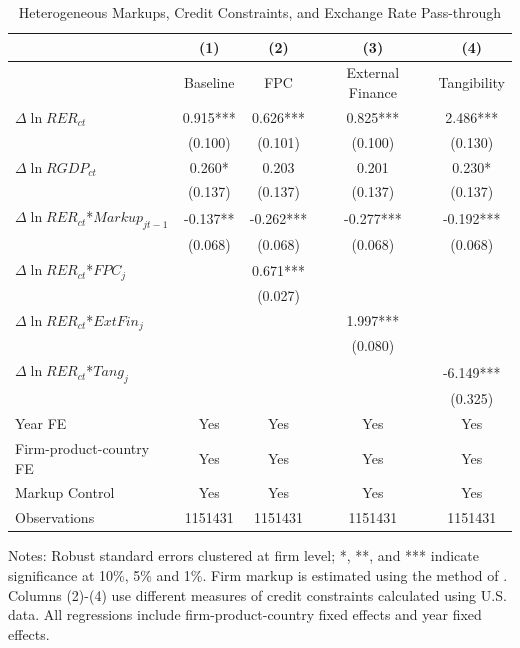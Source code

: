 \documentclass[12pt]{article}
\begin{document}
\begin{table}[htbp]
	\centering
	\caption{Heterogeneous Markups, Credit Constraints, and Exchange Rate Pass-through}
	\begin{threeparttable}
		\begin{tabular}{lcccc}
			\toprule         
			& (1)   & (2)   & (3)   & (4)     \\
			\midrule
			& Baseline      & FPC & External Finance& Tangibility        \\
			\midrule
			$\Delta \ln RER_{ct}$ & 0.915*** & 0.626*** & 0.825*** & 2.486***\\
			& (0.100) & (0.101) & (0.100) & (0.130) \\
			$\Delta \ln RGDP_{ct}$ & 0.260*	& 0.203 & 0.201 & 0.230*\\
			& (0.137) & (0.137) & (0.137) & (0.137)  \\
			$\Delta \ln RER_{ct}$*$Markup_{jt-1}$ & -0.137** & -0.262*** & -0.277*** & -0.192*** \\
			& (0.068) & (0.068) & (0.068) & (0.068) \\
			$\Delta \ln RER_{ct}$*$FPC_{j}$ &       & 0.671*** &       &  \\
			&       & (0.027) &       &   \\
			$\Delta \ln RER_{ct}$*$ExtFin_{j}$ &       &       & 1.997*** &  \\
			&       &       & (0.080) &   \\
			$\Delta \ln RER_{ct}$*$Tang_{j}$  &       &       &       & -6.149*** \\
			&       &       &       & (0.325) \\
			Year FE  & Yes   & Yes   & Yes   & Yes       \\
			Firm-product-country FE & Yes   & Yes   & Yes   & Yes       \\
			Markup Control & Yes   & Yes   & Yes   & Yes       \\
			Observations & 1151431 & 1151431 & 1151431 & 1151431  \\
			\bottomrule
		\end{tabular}
		\begin{tablenotes}
			\footnotesize
			\item[Notes:] Robust standard errors clustered at firm level; *, **, and *** indicate significance at 10\%, 5\% and 1\%. Firm markup is estimated using the method of \cite{dlw2012}. Columns (2)-(4) use different measures of credit constraints calculated using U.S. data. All regressions include firm-product-country fixed effects and year fixed effects.
		\end{tablenotes}
	\end{threeparttable}
        \label{tab.markup}
\end{table}
\end{document}
